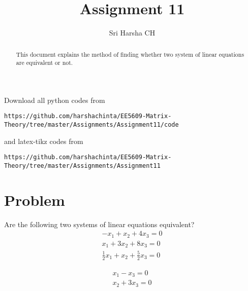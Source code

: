 \documentclass[journal,12pt,twocolumn]{IEEEtran}
\begin{document}
\renewcommand{\thefigure}{\theproblem}

\def\putbox#1#2#3{\makebox[0in][l]{\makebox[#1][l]{}\raisebox{\baselineskip}[0in][0in]{\raisebox{#2}[0in][0in]{#3}}}}
     \def\rightbox#1{\makebox[0in][r]{#1}}
     \def\centbox#1{\makebox[0in]{#1}}
     \def\topbox#1{\raisebox{-\baselineskip}[0in][0in]{#1}}
     \def\midbox#1{\raisebox{-0.5\baselineskip}[0in][0in]{#1}}
\vspace{3cm}
\title{Assignment 11}
\author{Sri Harsha CH}

\maketitle
\newpage

\bigskip
\renewcommand{\thefigure}{\theenumi}
\renewcommand{\thetable}{\theenumi}

\begin{abstract}
This document explains the method of finding whether two system of linear equations are equivalent or not.
\end{abstract}

Download all python codes from 
\begin{lstlisting}
https://github.com/harshachinta/EE5609-Matrix-Theory/tree/master/Assignments/Assignment11/code
\end{lstlisting}
%
and latex-tikz codes from 
%
\begin{lstlisting}
https://github.com/harshachinta/EE5609-Matrix-Theory/tree/master/Assignments/Assignment11
\end{lstlisting}
%
\section{Problem}
Are the following two systems of linear equations equivalent?
\begin{equation} \label{eq:eq1}
\begin{split}
    -x_1+x_2+4x_3=0\\
    x_1+3x_2+8x_3=0\\
    \frac{1}{2}x_1+x_2+\frac{5}{2}x_3=0
\end{split}
\end{equation}

\begin{equation} \label{eq:eq2}
\begin{split}
x_1-x_3=0\\
x_2+3x_3=0
\end{split}
\end{equation}
\end{document}
